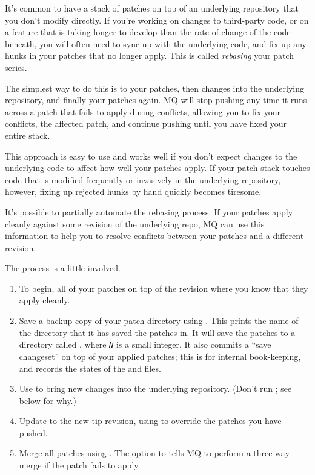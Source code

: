 It's common to have a stack of patches on top of an underlying
repository that you don't modify directly.  If you're working on
changes to third-party code, or on a feature that is taking longer to
develop than the rate of change of the code beneath, you will often
need to sync up with the underlying code, and fix up any hunks in your
patches that no longer apply.  This is called \emph{rebasing} your
patch series.

The simplest way to do this is to 
your patches, then  changes into the underlying
repository, and finally  your
patches again.  MQ will stop pushing any time it runs across a patch
that fails to apply during conflicts, allowing you to fix your
conflicts,  the affected patch, and continue pushing
until you have fixed your entire stack.

This approach is easy to use and works well if you don't expect
changes to the underlying code to affect how well your patches apply.
If your patch stack touches code that is modified frequently or
invasively in the underlying repository, however, fixing up rejected
hunks by hand quickly becomes tiresome.

It's possible to partially automate the rebasing process.  If your
patches apply cleanly against some revision of the underlying repo, MQ
can use this information to help you to resolve conflicts between your
patches and a different revision.

The process is a little involved.
\begin{enumerate}
\item To begin,  all of your patches on top of
  the revision where you know that they apply cleanly.
\item Save a backup copy of your patch directory using
  .  This prints
  the name of the directory that it has saved the patches in.  It will
  save the patches to a directory called
  , where \texttt{\emph{N}} is a small
  integer.  It also commits a ``save changeset'' on top of your
  applied patches; this is for internal book-keeping, and records the
  states of the  and  files.
\item Use  to bring new changes into the underlying
  repository.  (Don't run ; see below for why.)
\item Update to the new tip revision, using
   to override the patches you
  have pushed.
\item Merge all patches using .  The  option to 
  tells MQ to perform a three-way merge if the patch fails to apply.
\end{enumerate}

